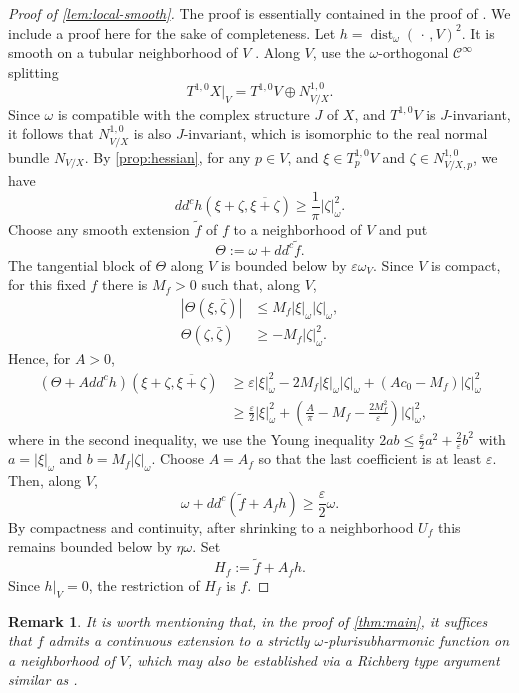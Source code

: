 \documentclass[12pt,reqno]{amsart}
\newtheorem{rem}{Remark}[section]
\newcommand{\ddc}{dd^c}
\begin{document}
	\begin{proof}[Proof of \cref{lem:local-smooth}]
		
		The proof is essentially contained in the proof of \cite[Proposition 2.1]{CGZ13}. We include a proof here for the sake of completeness.
		Let $h=\operatorname{dist}_\omega(\,\cdot\,,V)^2$. It is smooth on a tubular neighborhood of $V$ \cite{Ma}. Along $V$, use the  $\omega$-orthogonal $\mathcal C^\infty$ splitting
		\[
		T^{1,0}X|_V=T^{1,0}V\oplus N^{1,0}_{V/X}.
		\]
		Since $\omega $ is compatible with the complex structure $J$ of $X$, and $T^{1,0}V$ is $J$-invariant, it follows that $N^{1,0}_{V/X}$ is also $J$-invariant, which is isomorphic to the real normal bundle $N_{V/X}$.
		By \cref{prop:hessian}, for any $p\in V$, and $\xi\in T^{1,0}_pV$ and $\zeta\in N^{1,0}_{V/X,p}$, we have
		\begin{equation}\label{eq:distance-hessian}
			\ddc h(\xi+\zeta,\overline{\xi+\zeta})
			\geq \frac{1}{\pi}|\zeta|_\omega^2.
		\end{equation}
		Choose any smooth extension $\widetilde f$ of $f$ to a neighborhood of $V$ and put
		\[
		\Theta:=\omega+\ddc\widetilde f.
		\]
		The tangential block of $\Theta$ along $V$ is bounded below by $\varepsilon\omega_V$. Since $V$ is compact, for this fixed $f$ there is $M_f>0$ such that, along $V$,
		\begin{align*}
			|\Theta(\xi,\bar\zeta)|&\leq M_f|\xi|_\omega|\zeta|_\omega,\\
			\Theta(\zeta,\bar\zeta)&\geq-M_f|\zeta|_\omega^2.
		\end{align*}
		Hence, for $A>0$,
		\begin{align*}
			(\Theta+A\ddc h)(\xi+\zeta,\overline{\xi+\zeta})
			&\geq \varepsilon|\xi|_\omega^2
			-2M_f|\xi|_\omega|\zeta|_\omega
			+(Ac_0-M_f)|\zeta|_\omega^2\\
			&\geq \frac{\varepsilon}{2}|\xi|_\omega^2
			+\left(\frac{A}{\pi}-M_f-\frac{2M_f^2}{\varepsilon}\right)|\zeta|_\omega^2,
		\end{align*}
		where in the second inequality, we use the Young inequality $2ab\leq \frac{\varepsilon}{2}a^2+\frac{2}{\varepsilon}b^2$ with $a=|\xi|_\omega$ and $b=M_f|\zeta|_\omega$.
		Choose $A=A_f$ so that the last coefficient is at least $\varepsilon$. Then, along $V$,
		\[
		\omega+\ddc(\widetilde f+A_fh)\geq\frac{\varepsilon}{2}\omega.
		\]
		By compactness and continuity, after shrinking to a neighborhood $U_f$ this remains bounded below by $\eta\omega$. Set
		\[
		H_f:=\widetilde f+A_fh.
		\]
		Since $h|_V=0$, the restriction of $H_f$ is $f$.
	\end{proof}
	\begin{rem}
		It is worth mentioning that, in the proof of \cref{thm:main}, it suffices that $f$ admits a continuous extension to a strictly $\omega$-plurisubharmonic function on a neighborhood of $V$, which may also be established via a Richberg type argument similar as \cite{CT14}.
	\end{rem}
	
\end{document}
